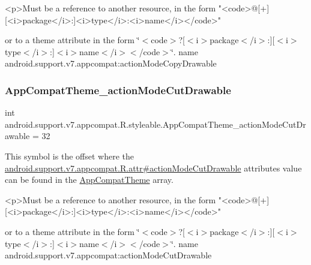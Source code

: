 \begin{DoxyVerb}      <p>Must be a reference to another resource, in the form "<code>@[+][<i>package</i>:]<i>type</i>:<i>name</i></code>"
\end{DoxyVerb}
 or to a theme attribute in the form \char`\"{}$<$code$>$?\mbox{[}$<$i$>$package$<$/i$>$\+:\mbox{]}\mbox{[}$<$i$>$type$<$/i$>$\+:\mbox{]}$<$i$>$name$<$/i$>$$<$/code$>$\char`\"{}.  name android.\+support.\+v7.\+appcompat\+:action\+Mode\+Copy\+Drawable \mbox{\label{classandroid_1_1support_1_1v7_1_1appcompat_1_1R_1_1styleable_abc2c7e57c9ef4bef8e58499d58c8e550}} 
\subsubsection{\texorpdfstring{App\+Compat\+Theme\+\_\+action\+Mode\+Cut\+Drawable}{AppCompatTheme\_actionModeCutDrawable}}
{\footnotesize\ttfamily int android.\+support.\+v7.\+appcompat.\+R.\+styleable.\+App\+Compat\+Theme\+\_\+action\+Mode\+Cut\+Drawable = 32\hspace{0.3cm}{\ttfamily [static]}}

This symbol is the offset where the \hyperlink{classandroid_1_1support_1_1v7_1_1appcompat_1_1R_1_1attr_a06308791b23bb0dfb5c10b607c6fb008}{android.\+support.\+v7.\+appcompat.\+R.\+attr\#action\+Mode\+Cut\+Drawable} attribute\textquotesingle{}s value can be found in the \hyperlink{classandroid_1_1support_1_1v7_1_1appcompat_1_1R_1_1styleable_a5c42f89e8a410c323be34208d75c430b}{App\+Compat\+Theme} array.

\begin{DoxyVerb}      <p>Must be a reference to another resource, in the form "<code>@[+][<i>package</i>:]<i>type</i>:<i>name</i></code>"
\end{DoxyVerb}
 or to a theme attribute in the form \char`\"{}$<$code$>$?\mbox{[}$<$i$>$package$<$/i$>$\+:\mbox{]}\mbox{[}$<$i$>$type$<$/i$>$\+:\mbox{]}$<$i$>$name$<$/i$>$$<$/code$>$\char`\"{}.  name android.\+support.\+v7.\+appcompat\+:action\+Mode\+Cut\+Drawable \mbox{\label{classandroid_1_1support_1_1v7_1_1appcompat_1_1R_1_1styleable_aa802ebe15a40ff9e5965784396ce6a54}} 
